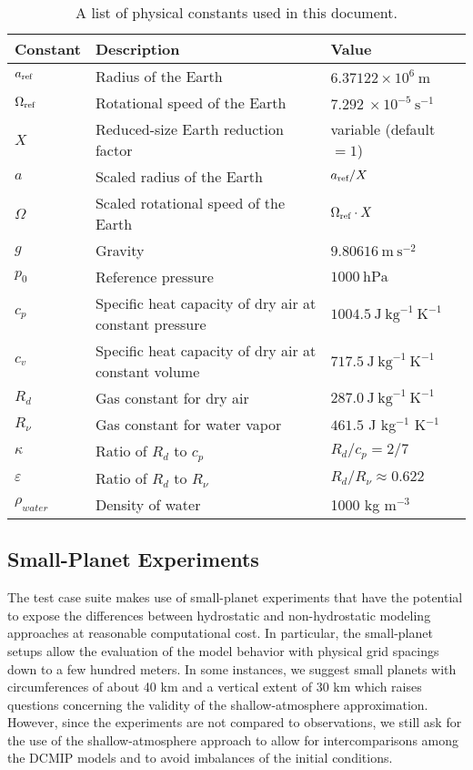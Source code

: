 \documentclass[times,doublespace]{fldauth}
\begin{document}
\begin{table}[h]
\caption{A list of physical constants used in this document.} \label{tab:PhysicalConstants}
\begin{tabular*}{\textwidth}{@{\extracolsep{\fill}}lll}
\hline Constant & Description & Value \\
\hline $a_{\tiny \mbox{ref}}$ & Radius of the Earth & $6.37122 \times 10^{6}\ \mbox{m}$ \\
$\Omega_{\tiny \mbox{ref}}$ & Rotational speed of the Earth & $7.292\ \times 10^{-5}\ \mbox{s}^{-1}$ \\
$X$ & Reduced-size Earth reduction factor & variable (default $= 1$) \\
$a$ & Scaled radius of the Earth & $a_{\tiny \mbox{ref}} / X$ \\
$\Omega$ & Scaled rotational speed of the Earth & $\Omega_{\tiny \mbox{ref}} \cdot X$ \\
$g$ & Gravity & $9.80616\ \mbox{m}\ \mbox{s}^{-2}$ \\
$p_0$ & Reference pressure & $1000\ \mbox{hPa}$ \\
$c_p$ & Specific heat capacity of dry air at constant pressure & $1004.5\ \mbox{J}\ \mbox{kg}^{-1}\ \mbox{K}^{-1}$ \\
$c_v$ & Specific heat capacity of dry air at constant volume & $717.5\ \mbox{J}\ \mbox{kg}^{-1}\ \mbox{K}^{-1}$ \\
$R_d$ & Gas constant for dry air & $287.0\ \mbox{J}\ \mbox{kg}^{-1}\ \mbox{K}^{-1}$ \\
$R_\nu$ & Gas constant for water vapor & $461.5$ J kg$^{-1}$ K$^{-1}$ \\
$\kappa$ & Ratio of $R_d$ to $c_p$ & $R_d/c_p = 2/7$ \\
$\varepsilon$ & Ratio of $R_d$ to $R_\nu$ & $R_d/R_\nu \approx 0.622$ \\
$\rho_{water}$ & Density of water & 1000 kg m$^{-3}$ \\
\hline 
\end{tabular*}

\end{table}

\subsection{Small-Planet Experiments}
The test case suite makes use of small-planet experiments that have the potential to expose the differences between hydrostatic and non-hydrostatic modeling approaches at reasonable computational cost. In particular, the small-planet setups allow the evaluation of the model behavior with physical grid spacings down to a few hundred meters. In some instances, we suggest small planets with circumferences of about 40 km and a vertical extent of 30 km which raises questions concerning the validity of the shallow-atmosphere approximation. However, since the experiments are not compared to observations, we still ask for the use of the shallow-atmosphere approach to allow for intercomparisons among the DCMIP models and to avoid imbalances of the initial conditions.
\end{document}
